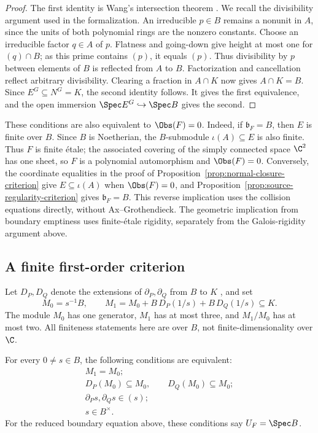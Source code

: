 \begin{proof}
The first identity is Wang's intersection theorem
\cite[Theorem~41(i)]{Wang1980}.  We recall the divisibility argument
used in the formalization.  An irreducible \(p\in B\) remains a
nonunit in \(A\), since the units of both polynomial rings are the
nonzero constants.  Choose an irreducible factor \(q\in A\) of \(p\).
Flatness and going-down give height at most one for \((q)\cap B\);
as this prime contains \((p)\), it equals \((p)\).  Thus divisibility
by \(p\) between elements of \(B\) is reflected from \(A\) to \(B\).
Factorization and cancellation reflect arbitrary divisibility.
Clearing a fraction in \(A\cap K\) now gives \(A\cap K=B\).
Since \(E^G\subseteq N^G=K\), the second identity follows.
It gives the first equivalence, and the open immersion
\(\Spec E^G\hookrightarrow\Spec B\) gives the second.
\end{proof}

These conditions are also equivalent to \(\Obs(F)=0\).  Indeed, if
\(\mathfrak b_F=B\), then \(E\) is finite over \(B\).  Since \(B\)
is Noetherian, the \(B\)-submodule \(\iota(A)\subseteq E\) is also finite.
Thus \(F\) is
finite \'etale; the associated covering of the simply connected space
\(\C^2\) has one sheet, so \(F\) is a polynomial automorphism and
\(\Obs(F)=0\).  Conversely, the coordinate equalities in the proof of
Proposition~\ref{prop:normal-closure-criterion} give
\(E\subseteq\iota(A)\) when \(\Obs(F)=0\), and
Proposition~\ref{prop:source-regularity-criterion} gives
\(\mathfrak b_F=B\).  This reverse implication uses the collision
equations directly, without Ax--Grothendieck.  The geometric implication
from boundary emptiness uses finite-\'etale rigidity, separately from
the Galois-rigidity argument above.

\subsection{A finite first-order criterion}

Let \(D_P,D_Q\) denote the extensions of \(\partial_P,\partial_Q\)
from \(B\) to \(K\) \cite{StacksDerivationLocalization}, and set
\[
  M_0=s^{-1}B,\qquad
  M_1=M_0+B\,D_P(1/s)+B\,D_Q(1/s)\subseteq K.
\]
The module \(M_0\) has one generator, \(M_1\) has at most three, and
\(M_1/M_0\) has at most two.  All finiteness statements here are over
\(B\), not finite-dimensionality over \(\C\).

\begin{proposition}
\label{prop:finite-boundary-criterion}
For every \(0\ne s\in B\), the following conditions are equivalent:
\[
  \begin{gathered}
  M_1=M_0;\\
  D_P(M_0)\subseteq M_0,\qquad D_Q(M_0)\subseteq M_0;\\
  \partial_Ps,\partial_Qs\in(s);\\
  s\in B^\times.
  \end{gathered}
\]
For the reduced boundary equation above, these conditions say
\(U_F=\Spec B\).
\end{proposition}

